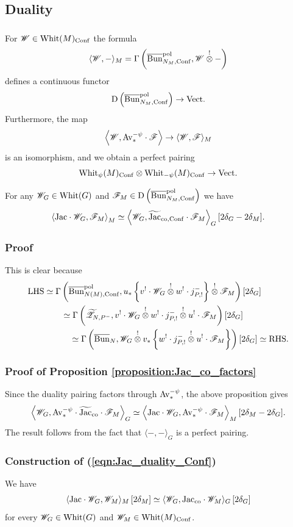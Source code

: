 \subsection{Duality} 

\subsubsection{} For $\mathscr{W} \in \mathrm{Whit}(M)_{\mathrm{Conf}}$ the formula
  \[\langle \mathscr{W}, - \rangle_M = \Gamma\left(\overline{\mathrm{Bun}}_{N_M,\mathrm{Conf}}^{\mathrm{pol}}, \mathscr{W} \overset{!}{\otimes} - \right)\]
defines a continuous functor
  \[\mathrm{D}\left( \overline{\mathrm{Bun}}_{N_M,\mathrm{Conf}}^{\mathrm{pol}} \right) \to \mathrm{Vect}.\]
Furthermore, the map
    \[
    \left\langle \mathscr{W}, \mathrm{Av}_*^{-\psi} \cdot \mathscr{F} \right\rangle 
    \to \langle \mathscr{W}, \mathscr{F} \rangle_M 
    \]
is an isomorphism, and we obtain a perfect pairing
  \[\mathrm{Whit}_\psi(M)_{\mathrm{Conf}} \otimes \mathrm{Whit}_{-\psi}(M)_{\mathrm{Conf}} \to \mathrm{Vect}.\]

\begin{proposition}
For any $\mathscr{W}_G \in \mathrm{Whit}(G)$ and $\mathscr{F}_M \in \mathrm{D}\left( \overline{\mathrm{Bun}}_{N_M,\mathrm{Conf}}^{\mathrm{pol}} \right)$ we have
    \[
    \left\langle \mathrm{Jac} \cdot \mathscr{W}_G, \mathscr{F}_M \right\rangle_M 
    \simeq \left\langle \mathscr{W}_G, \widetilde{\mathrm{Jac}}_{\mathrm{co},\mathrm{Conf}} \cdot \mathscr{F}_M \right\rangle_G [2 \delta_G - 2 \delta_M].
    \]
\end{proposition}

\subsubsection{Proof} This is clear because
\begin{align*}
  \mathrm{LHS} & \simeq \Gamma\left( \overline{\mathrm{Bun}}_{N(M),\mathrm{Conf}}^{\mathrm{pol}}, u_* \left\{ v^! \cdot \mathscr{W}_G \overset{!}{\otimes} w^! \cdot j_{P,!}^- \right\} \overset{!}{\otimes} \mathscr{F}_M \right) [2\delta_G] \\
  & \qquad \simeq \Gamma\left( {\widetilde{\mathscr{Z}}}_{N,P^-}, v^! \cdot \mathscr{W}_G \overset{!}{\otimes} w^! \cdot j_{P,!}^- \overset{!}{\otimes} u^! \cdot \mathscr{F}_M \right) [2\delta_G] \\
  & \qquad\quad \simeq \Gamma\left( \overline{\mathrm{Bun}}_N, \mathscr{W}_G \overset{!}{\otimes} v_* \left\{ w^! \cdot j_{P,!}^- \overset{!}{\otimes} u^! \cdot \mathscr{F}_M \right\} \right) [2 \delta_G] \simeq \mathrm{RHS}.
\end{align*}

\subsubsection{Proof of Proposition \ref{proposition:Jac_co_factors}} Since the duality pairing factors through $\mathrm{Av}_*^{-\psi}$, the above proposition gives
  \[
  \left\langle \mathscr{W}_G, \mathrm{Av}_*^{-\psi} \cdot \widetilde{\mathrm{Jac}}_{\mathrm{co}} \cdot \mathscr{F}_M \right\rangle_G
  \simeq \left\langle \mathrm{Jac} \cdot \mathscr{W}_G, \mathrm{Av}_*^{-\psi} \cdot \mathscr{F}_M \right\rangle_M [2\delta_M - 2\delta_G].
  \]
The result follows from the fact that $\langle -, - \rangle_G$ is a perfect pairing.

\subsubsection{Construction of (\ref{eqn:Jac_duality_Conf})} We have
    \[
    \langle \mathrm{Jac} \cdot \mathscr{W}_G, \mathscr{W}_M \rangle_M \, [2\delta_M]
    \simeq \langle  \mathscr{W}_G, \mathrm{Jac}_{\mathrm{co}} \cdot \mathscr{W}_M \rangle_G \, [2\delta_G]
    \]
for every $\mathscr{W}_G \in \mathrm{Whit}(G)$ and $\mathscr{W}_M \in \mathrm{Whit}(M)_{\mathrm{Conf}}$.
